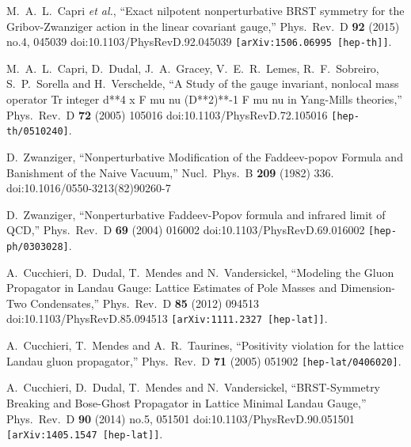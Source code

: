 \documentclass[a4paper,11pt,british,twosides]{book}%
\numberwithin{equation}{section}
\begin{document}
\begin{thebibliography}{9}
  M.~A.~L.~Capri {\it et al.},
  ``Exact nilpotent nonperturbative BRST symmetry for the Gribov-Zwanziger action in the linear
  covariant gauge,''
  Phys.\ Rev.\ D {\bf 92} (2015) no.4,  045039
  doi:10.1103/PhysRevD.92.045039
  {\tt [arXiv:1506.06995 [hep-th]]}.

  M.~A.~L.~Capri, D.~Dudal, J.~A.~Gracey, V.~E.~R.~Lemes, R.~F.~Sobreiro, S.~P.~Sorella and
  H.~Verschelde,
  ``A Study of the gauge invariant, nonlocal mass operator Tr integer d**4 x F mu nu (D**2)**-1
  F mu nu in Yang-Mills theories,''
  Phys.\ Rev.\ D {\bf 72} (2005) 105016
  doi:10.1103/PhysRevD.72.105016
  {\tt [hep-th/0510240]}.

  D.~Zwanziger,
  ``Nonperturbative Modification of the Faddeev-popov Formula and Banishment of the Naive
  Vacuum,''
  Nucl.\ Phys.\ B {\bf 209} (1982) 336.
  doi:10.1016/0550-3213(82)90260-7

  D.~Zwanziger,
  ``Nonperturbative Faddeev-Popov formula and infrared limit of QCD,''
  Phys.\ Rev.\ D {\bf 69} (2004) 016002
  doi:10.1103/PhysRevD.69.016002
  {\tt [hep-ph/0303028]}.

  A.~Cucchieri, D.~Dudal, T.~Mendes and N.~Vandersickel,
  ``Modeling the Gluon Propagator in Landau Gauge: Lattice Estimates of Pole Masses and Dimension-Two Condensates,''
  Phys.\ Rev.\ D {\bf 85} (2012) 094513
  doi:10.1103/PhysRevD.85.094513
  {\tt [arXiv:1111.2327 [hep-lat]]}.

  A.~Cucchieri, T.~Mendes and A.~R.~Taurines,
  ``Positivity violation for the lattice Landau gluon propagator,''
  Phys.\ Rev.\ D {\bf 71} (2005) 051902
  {\tt [hep-lat/0406020]}.

  A.~Cucchieri, D.~Dudal, T.~Mendes and N.~Vandersickel,
  ``BRST-Symmetry Breaking and Bose-Ghost Propagator in Lattice Minimal Landau Gauge,''
  Phys.\ Rev.\ D {\bf 90} (2014) no.5,  051501
  doi:10.1103/PhysRevD.90.051501
  {\tt [arXiv:1405.1547 [hep-lat]]}.


\end{thebibliography}
\end{document}
